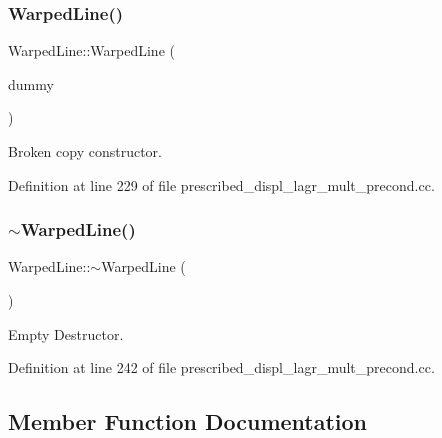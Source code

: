 \subsubsection{\texorpdfstring{Warped\+Line()}{WarpedLine()}\hspace{0.1cm}{\footnotesize\ttfamily [6/6]}}
{\footnotesize\ttfamily Warped\+Line\+::\+Warped\+Line (\begin{DoxyParamCaption}\item[{const \hyperlink{classWarpedLine}{Warped\+Line} \&}]{dummy }\end{DoxyParamCaption})\hspace{0.3cm}{\ttfamily [inline]}}



Broken copy constructor. 



Definition at line 229 of file prescribed\+\_\+displ\+\_\+lagr\+\_\+mult\+\_\+precond.\+cc.

\mbox{\label{classWarpedLine_a4cb07fb7f06d42e2008afe65d8750cad}} 
\subsubsection{\texorpdfstring{$\sim$\+Warped\+Line()}{~WarpedLine()}\hspace{0.1cm}{\footnotesize\ttfamily [3/3]}}
{\footnotesize\ttfamily Warped\+Line\+::$\sim$\+Warped\+Line (\begin{DoxyParamCaption}{ }\end{DoxyParamCaption})\hspace{0.3cm}{\ttfamily [inline]}}



Empty Destructor. 



Definition at line 242 of file prescribed\+\_\+displ\+\_\+lagr\+\_\+mult\+\_\+precond.\+cc.



\subsection{Member Function Documentation}
\mbox{\label{classWarpedLine_ae43c2f997b9c0de62783375341ac5794}} 
